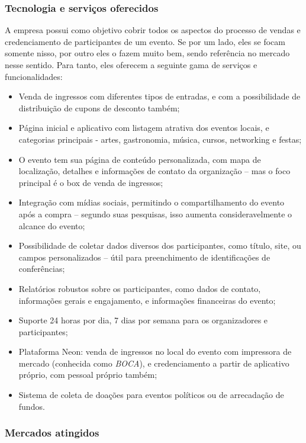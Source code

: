\documentclass[12pt,a4paper,twoside,hyphens,english,brazil]{abntex2}
\begin{document}
\subsubsection*{Tecnologia e serviços oferecidos}
A empresa possui como objetivo cobrir todos os aspectos do processo de vendas e credenciamento de participantes de um evento. Se por um lado, eles se focam somente nisso, por outro eles o fazem muito bem, sendo referência no mercado nesse sentido. Para tanto, eles oferecem a seguinte gama de serviços e funcionalidades:
\begin{itemize}
	\item Venda de ingressos com diferentes tipos de entradas, e com a possibilidade de distribuição de cupons de desconto também;
	\item Página inicial e aplicativo com listagem atrativa dos eventos locais, e categorias principais - artes, gastronomia, música, cursos, networking e festas;
	\item O evento tem sua página de conteúdo personalizada, com mapa de localização, detalhes e informações de contato da organização -- mas o foco principal é o box de venda de ingressos;
	\item Integração com mídias sociais, permitindo o compartilhamento do evento após a compra -- segundo suas pesquisas, isso aumenta consideravelmente o alcance do evento;
	\item Possibilidade de coletar dados diversos dos participantes, como título, site, ou campos personalizados -- útil para preenchimento de identificações de conferências;
	\item Relatórios robustos sobre os participantes, como dados de contato, informações gerais e engajamento, e informações financeiras do evento;
	\item Suporte 24 horas por dia, 7 dias por semana para os organizadores e participantes;
	\item Plataforma Neon: venda de ingressos no local do evento com impressora de mercado (conhecida como \emph{BOCA}), e credenciamento a partir de aplicativo próprio, com pessoal próprio também;
	\item Sistema de coleta de doações para eventos políticos ou de arrecadação de fundos.
\end{itemize}

\subsubsection*{Mercados atingidos}
\end{document}
